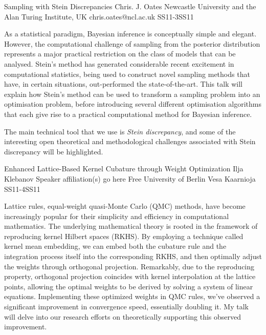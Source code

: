 \begin{talk}
  {Sampling with Stein Discrepancies}%
  {Chris. J. Oates}%
  {Newcastle University and the Alan Turing Institute, UK}%
  {chris.oates@ncl.ac.uk}%
  {}%
{}{}{SS11-3}{SS11}


As a statistical paradigm, Bayesian inference is conceptually simple and elegant.  However, the computational challenge of sampling from the posterior distribution represents a major practical restriction on the class of models that can be analysed.  Stein's method has generated considerable recent excitement in computational statistics, being used to construct novel sampling methods that have, in certain situations, out-performed the state-of-the-art.  This talk will explain how Stein's method can be used to transform a sampling problem into an optimisation problem, before introducing several different optimisation algorithms that each give rise to a practical computational method for Bayesian inference.

The main technical tool that we use is \emph{Stein discrepancy}, and some of the interesting open theoretical and methodological challenges associated with Stein discrepancy will be highlighted.
\end{talk}

\begin{talk}
  {Enhanced Lattice-Based Kernel Cubature through Weight Optimization}%
  {Ilja Klebanov}%
  {Speaker affiliation(s) go here}%
  {Free University of Berlin}%
  {Vesa Kaarnioja}%
{}{}{SS11-4}{SS11}

			
Lattice rules, equal-weight quasi-Monte Carlo (QMC) methods, have become increasingly popular for their simplicity and efficiency in computational mathematics. The underlying mathematical theory is rooted in the framework of reproducing kernel Hilbert spaces (RKHS). By employing a technique called kernel mean embedding, we can embed both the cubature rule and the integration process itself into the corresponding RKHS, and then optimally adjust the weights through orthogonal projection. Remarkably, due to the reproducing property, orthogonal projection coincides with kernel interpolation at the lattice points, allowing the optimal weights to be derived by solving a system of linear equations. Implementing these optimized weights in QMC rules, we've observed a significant improvement in convergence speed, essentially doubling it. My talk will delve into our research efforts on theoretically supporting this observed improvement.
\end{talk}

